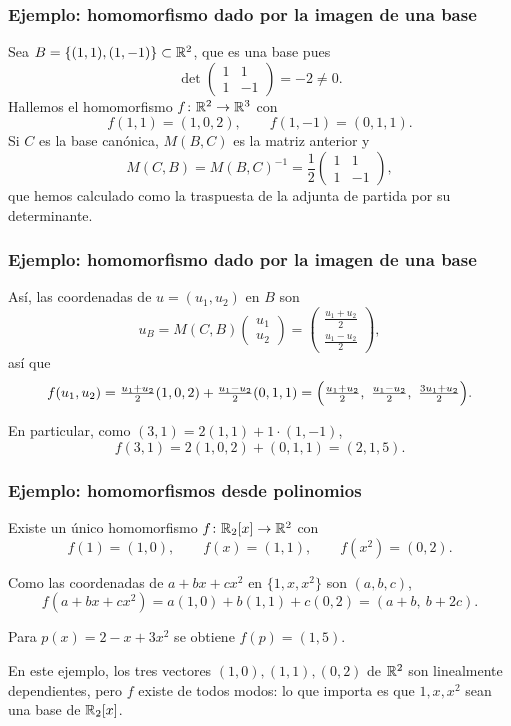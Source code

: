 \begin{frame}
    \frametitle{Ejemplo: homomorfismo dado por la imagen de una base}

    \begin{example}
        Sea $B=\{(1,1),(1,-1)\}\subset\mathbb{R}^2$, que es una base pues
        \[
            \det \begin{pmatrix}1&1\\1&-1\end{pmatrix}=-2\neq0.
        \]
        Hallemos el
        homomorfismo $f\colon\mathbb{R}^2\to\mathbb{R}^3$ con
        \[
            f(1,1)=(1,0,2),\qquad f(1,-1)=(0,1,1).
        \]
        Si $C$ es la base canónica, $M(B,C)$ es la matriz anterior y 
        \[M(C,B)=M(B,C)^{-1}=\frac{1}{2}\begin{pmatrix}1&1\\1&-1\end{pmatrix},\]
        que hemos calculado como la traspuesta de la adjunta de partida por su determinante.
    \end{example}

\end{frame}

\begin{frame}
    \frametitle{Ejemplo: homomorfismo dado por la imagen de una base}
    
    Así, las coordenadas de $u=(u_1,u_2)$ en $B$ son
    \[
        u_B=M(C,B)\begin{pmatrix}u_1\\u_2\end{pmatrix}
        =\begin{pmatrix}\frac{u_1+u_2}{2}\\[0.5ex]\frac{u_1-u_2}{2}\end{pmatrix},
    \]
    así que
    \[
        f(u_1,u_2)=\tfrac{u_1+u_2}{2}(1,0,2)+\tfrac{u_1-u_2}{2}(0,1,1)
        =\Bigl(\tfrac{u_1+u_2}{2},\ \tfrac{u_1-u_2}{2},\ \tfrac{3u_1+u_2}{2}\Bigr).
    \]

    \medskip

    En particular, como $(3,1)=2(1,1)+1\cdot(1,-1)$,
    \[
        f(3,1)=2(1,0,2)+(0,1,1)=(2,1,5).
    \]
\end{frame}


\begin{frame}
    \frametitle{Ejemplo: homomorfismos desde polinomios}

    \begin{example}
        Existe un único homomorfismo $f\colon\mathbb{R}_2[x]\to\mathbb{R}^2$ con
        \[
            f(1)=(1,0),\qquad f(x)=(1,1),\qquad f(x^2)=(0,2).
        \]
    \end{example}

    Como las coordenadas de $a+bx+cx^2$ en $\{1,x,x^2\}$ son $(a,b,c)$,
    \[
        f(a+bx+cx^2)=a(1,0)+b(1,1)+c(0,2)=(a+b,\ b+2c).
    \]

    \medskip

    Para $p(x)=2-x+3x^2$ se obtiene $f(p)=(1,5)$.

    \medskip

    En este ejemplo, los tres vectores $(1,0),(1,1),(0,2)$ de $\mathbb{R}^2$ son
    linealmente dependientes, pero $f$ existe de todos modos: lo que
    importa es que $1,x,x^2$ sean una \alert{base} de $\mathbb{R}_2[x]$.
\end{frame}
